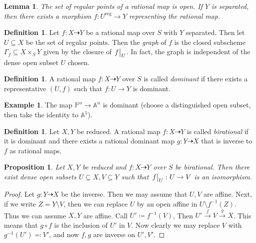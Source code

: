 \documentclass[leqno, openany]{memoir}
\newtheorem{prop}[thm]{Proposition}
\newtheorem{lem}[thm]{Lemma}
\theoremstyle{definition}
\newtheorem{defn}[thm]{Definition}
\newtheorem{exm}[thm]{Example}
\theoremstyle{remark}
\theoremstyle{plain}
\theoremstyle{definition}
\theoremstyle{remark}
\newcommand{\A}{\mathbb{A}}
\renewcommand{\P}{\mathbb{P}}
\newcommand{\mr}[1]{\mathrm{#1}}
\begin{document}
\begin{lem}
    The set of regular points of a rational map is open. If $Y$ is separated, then there exists a morphism $f \colon U^{\mr{reg}} \to Y$ representing the rational map.
\end{lem}

\begin{defn}
    Let $f \colon X \dashrightarrow Y$ be a rational map over $S$ with $Y$ separated. Then let $U \subseteq X$ be the set of regular points. Then the \textit{graph} of $f$ is the closed subscheme $\Gamma_f \subseteq X \times_S Y$ given by the closure of $\eval{f}_U$. In fact, the graph is independent of the dense open subset $U$ chosen.
\end{defn}

\begin{defn}
    A rational map $f \colon X \dashrightarrow Y$ over $S$ is called \textit{dominant} if there exists a representative $(U, f)$ such that $f \colon U \to Y$ is dominant. 
\end{defn}

\begin{exm}
    The map $\P^n \to \A^n$ is dominant (choose a distinguished open subset, then take the identity to $\A^1$).
\end{exm}

\begin{defn}
    Let $X,Y$ be reduced. A rational map $f \colon X \dashrightarrow Y$ is called \textit{birational} if it is dominant and there exists a rational dominant map $g \colon Y \dashrightarrow X$ that is inverse to $f$ as rational maps. 
\end{defn}

\begin{prop}
    Let $X, Y$ be reduced and $f \colon X \dashrightarrow Y$ over $S$ be birational. Then there exist dense open subsets $U \subseteq X, V \subseteq Y$ such that $\eval{f}_U \colon U \to V$ is an isomorphism.
\end{prop}

\begin{proof}
    Let $g \colon Y \dashrightarrow X$ be the inverse. Then we may assume that $U, V$ are affine. Next, if we write $Z = Y \setminus V$, then we can replace $U$ by an open affine in $U \setminus f^{-1}(Z)$. Thus we can assume $X,Y$ are affine. Call $U' \coloneqq f^{-1}(V)$, Then $U' \xrightarrow{f} V \xrightarrow{g} X$. This means that $g \circ f$ is the inclusion of $U'$ in $V$. Now clearly we may replace $V$ with $g^{-1}(U') \eqqcolon V'$, and now $f,g$ are inverse on $U', V'$.
\end{proof}
\end{document}
